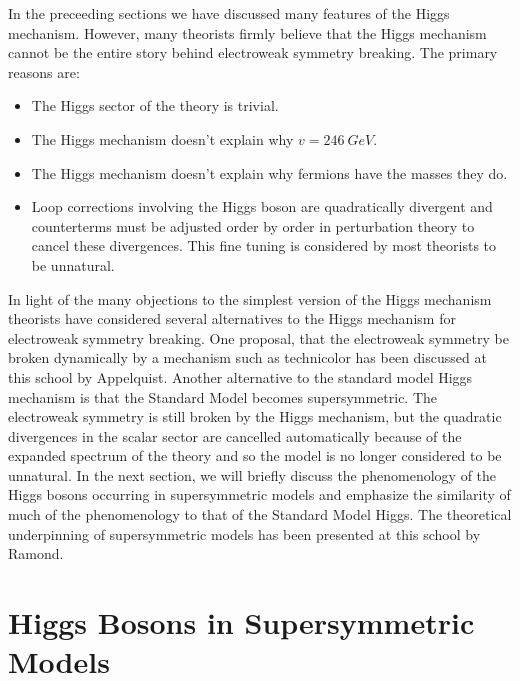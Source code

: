 In the preceeding sections we have discussed many features of the
Higgs mechanism.  However, many theorists firmly believe that the
Higgs mechanism cannot be the entire story behind electroweak symmetry
breaking.  The primary reasons are:
\begin{itemize}
\item  The Higgs sector of the theory is trivial.

\item  The Higgs mechanism doesn't explain why $v=246~GeV$.

\item  The Higgs mechanism doesn't explain why fermions have
the masses they do.

\item  Loop corrections involving the Higgs boson are quadratically
divergent and counterterms must be adjusted order by order in
perturbation theory to cancel these divergences.  This fine tuning
is  considered by most theorists to be unnatural.

\end{itemize}

In light of the many
objections to the simplest version of the Higgs mechanism
theorists have considered several alternatives
 to the Higgs mechanism for electroweak symmetry breaking.
One proposal, that the electroweak symmetry be broken dynamically
by a mechanism such as technicolor has been discussed at this school by
Appelquist.\cite{aptasi}
Another alternative to the standard model Higgs mechanism is that the
Standard Model becomes supersymmetric.  The electroweak symmetry
is still broken by the Higgs mechanism, but the quadratic
divergences in the scalar sector
are cancelled automatically because of the expanded
spectrum of the theory and so the model is no longer considered to be
unnatural.  In the next section, we  will briefly discuss the phenomenology
of the Higgs bosons occurring in supersymmetric models
and emphasize the similarity of much of the phenomenology to that of the
Standard Model Higgs.
 The theoretical
underpinning of supersymmetric models has been presented at this
school by
Ramond.\cite{ramond}

\section{Higgs Bosons in Supersymmetric Models}

